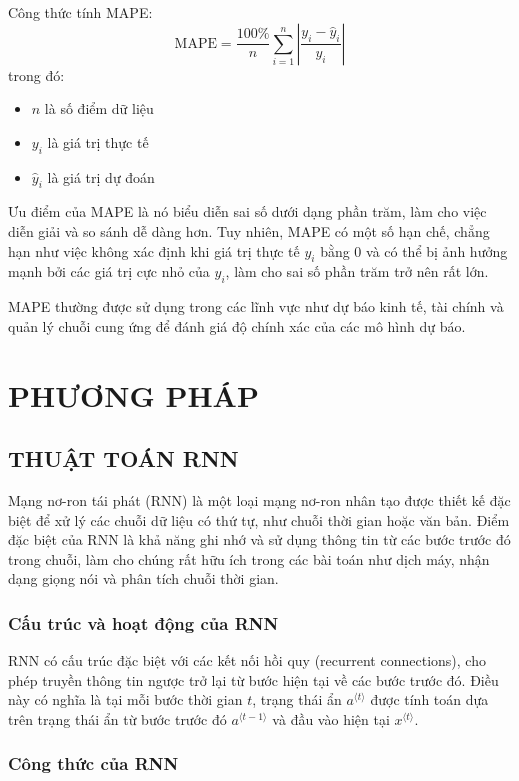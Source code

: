 \documentclass[conference]{IEEEtran}
\begin{document}
Công thức tính MAPE:
\[
\text{MAPE} = \frac{100\%}{n} \sum_{i=1}^{n} \left| \frac{y_i - \hat{y}_i}{y_i} \right|
\]
trong đó:
\begin{itemize}
    \item $n$ là số điểm dữ liệu
    \item $y_i$ là giá trị thực tế
    \item $\hat{y}_i$ là giá trị dự đoán
\end{itemize}

Ưu điểm của MAPE là nó biểu diễn sai số dưới dạng phần trăm, làm cho việc diễn giải và so sánh dễ dàng hơn. Tuy nhiên, MAPE có một số hạn chế, chẳng hạn như việc không xác định khi giá trị thực tế $y_i$ bằng 0 và có thể bị ảnh hưởng mạnh bởi các giá trị cực nhỏ của $y_i$, làm cho sai số phần trăm trở nên rất lớn.

MAPE thường được sử dụng trong các lĩnh vực như dự báo kinh tế, tài chính và quản lý chuỗi cung ứng để đánh giá độ chính xác của các mô hình dự báo.
\section{PHƯƠNG PHÁP}

\subsection{THUẬT TOÁN RNN}

 Mạng nơ-ron tái phát (RNN) là một loại mạng nơ-ron nhân tạo được thiết kế đặc biệt để xử lý các chuỗi dữ liệu có thứ tự, như chuỗi thời gian hoặc văn bản. Điểm đặc biệt của RNN là khả năng ghi nhớ và sử dụng thông tin từ các bước trước đó trong chuỗi, làm cho chúng rất hữu ích trong các bài toán như dịch máy, nhận dạng giọng nói và phân tích chuỗi thời gian.

\subsubsection{Cấu trúc và hoạt động của RNN}

RNN có cấu trúc đặc biệt với các kết nối hồi quy (recurrent connections), cho phép truyền thông tin ngược trở lại từ bước hiện tại về các bước trước đó. Điều này có nghĩa là tại mỗi bước thời gian \(t\), trạng thái ẩn \(a^{\langle t \rangle}\) được tính toán dựa trên trạng thái ẩn từ bước trước đó \(a^{\langle t-1 \rangle}\) và đầu vào hiện tại \(x^{\langle t \rangle}\).

\subsubsection{Công thức của RNN}
\end{document}
